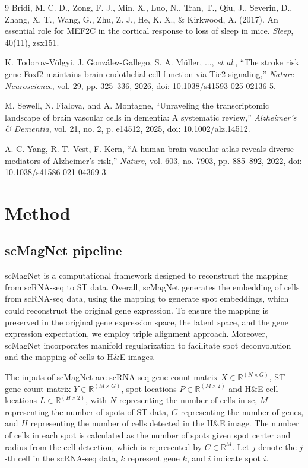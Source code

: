 \documentclass[10pt,a4paper]{article}
\begin{document}
\begin{thebibliography}{9}
Bridi, M. C. D., Zong, F. J., Min, X., Luo, N., Tran, T., Qiu, J., Severin, D., Zhang, X. T., Wang, G., Zhu, Z. J., He, K. X., \& Kirkwood, A. (2017). An essential role for MEF2C in the cortical response to loss of sleep in mice. \emph{Sleep}, 40(11), zsx151.

K. Todorov-V\"olgyi, J. Gonz\'alez-Gallego, S. A. M\"uller, ..., \emph{et al.}, ``The stroke risk gene Foxf2 maintains brain endothelial cell function via Tie2 signaling,'' \emph{Nature Neuroscience}, vol. 29, pp. 325--336, 2026, doi: 10.1038/s41593-025-02136-5.

M. Sewell, N. Fialova, and A. Montagne, ``Unraveling the transcriptomic landscape of brain vascular cells in dementia: A systematic review,'' \emph{Alzheimer's \& Dementia}, vol. 21, no. 2, p. e14512, 2025, doi: 10.1002/alz.14512.

A. C. Yang, R. T. Vest, F. Kern, ``A human brain vascular atlas reveals diverse mediators of Alzheimer's risk,'' \emph{Nature}, vol. 603, no. 7903, pp. 885--892, 2022, doi: 10.1038/s41586-021-04369-3.

\end{thebibliography}

\section{Method}
\subsection{scMagNet pipeline}
scMagNet is a computational framework designed to reconstruct the mapping from scRNA-seq to ST data. Overall, scMagNet generates the embedding of cells from scRNA-seq data, using the mapping to generate spot embeddings, which could reconstruct the original gene expression. To ensure the mapping is preserved in the original gene expression space, the latent space, and the gene expression expectation, we employ triple alignment approach. Moreover, scMagNet incorporates manifold regularization to facilitate spot deconvolution and the mapping of cells to H\&E images.

The inputs of scMagNet are scRNA-seq gene count matrix $X \in \mathbb{R}^{(N \times G)}$, ST gene count matrix $Y \in \mathbb{R}^{(M \times G)}$, spot locations $P \in \mathbb{R}^{(M \times 2)}$ and H\&E cell locations $L \in \mathbb{R}^{(H \times 2)}$, with $N$ representing the number of cells in sc, $M$ representing the number of spots of ST data, $G$ representing the number of genes, and $H$ representing the number of cells detected in the H\&E image. The number of cells in each spot is calculated as the number of spots given spot center and radius from the cell detection, which is represented by $C \in \mathbb{R}^{M}$. Let $j$ denote the $j$-th cell in the scRNA-seq data, $k$ represent gene $k$, and $i$ indicate spot $i$.
\end{document}
